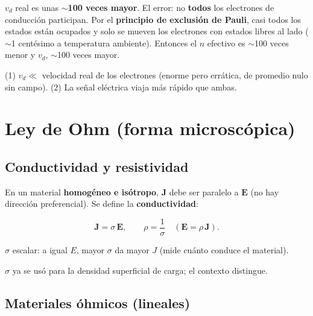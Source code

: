 \documentclass[12pt,a4paper]{article}
\begin{document}
\begin{warnbox}
  $v_d$ real es unas \textbf{$\sim$100 veces mayor}. El error: no
  \textbf{todos} los electrones de conducción participan. Por el
  \textbf{principio de exclusión de Pauli}, casi todos los estados están
  ocupados y solo se mueven los electrones con estados libres al lado
  ($\sim$1 centésimo a temperatura ambiente). Entonces el $n$ efectivo es
  $\sim$100 veces menor y $v_d$, $\sim$100 veces mayor.
\end{warnbox}

\begin{notebox}
  (1) $v_d \ll$ velocidad real de los electrones (enorme pero errática,
  de promedio nulo sin campo). (2) La señal eléctrica viaja más rápido
  que ambas.
\end{notebox}

\section{Ley de Ohm (forma microscópica)}

\subsection{Conductividad y resistividad}

En un material \textbf{homogéneo e isótropo}, $\mathbf{J}$ debe ser
paralelo a $\mathbf{E}$ (no hay dirección preferencial). Se define la
\textbf{conductividad}:

\begin{keybox}
  \[
  \boxed{\mathbf{J} = \sigma\, \mathbf{E}}, \qquad
  \boxed{\rho = \frac{1}{\sigma}} \quad (\mathbf{E} = \rho\,\mathbf{J}).
  \]
\end{keybox}

$\sigma$ escalar: a igual $E$, mayor $\sigma$ da mayor $J$ (mide cuánto
conduce el material).

\begin{notebox}[Notación]
  $\sigma$ ya se usó para la densidad superficial de carga; el contexto
  distingue.
\end{notebox}

\subsection{Materiales óhmicos (lineales)}
\end{document}
